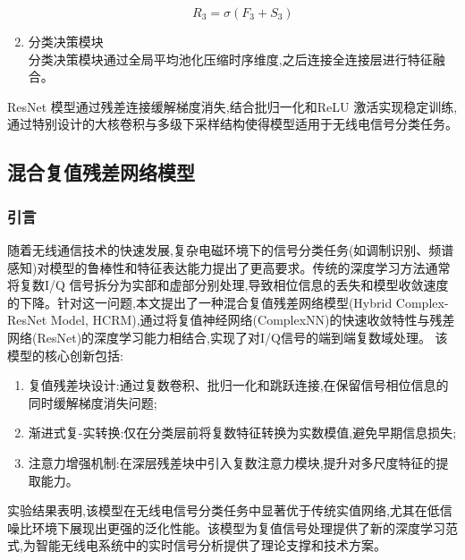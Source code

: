 \documentclass{article}
\begin{document}
\begin{CJK}{UTF8}{gbsn}
\begin{enumerate}
\begin{equation}
        \label{eq:residual_deepen1}
    \end{equation}
    \begin{equation}
        R_{3}=\sigma(F_{3}+S_{3})
        \label{eq:residual_deepen2}
    \end{equation}
    \item 分类决策模块 \\
    分类决策模块通过全局平均池化压缩时序维度,之后连接全连接层进行特征融合。
\end{enumerate}
ResNet 模型通过残差连接缓解梯度消失,结合批归一化和ReLU 激活实现稳定训练,通过特别设计的大核卷积与多级下采样结构使得模型适用于无线电信号分类任务。

\subsection{混合复值残差网络模型}
\subsubsection{引言}
随着无线通信技术的快速发展,复杂电磁环境下的信号分类任务(如调制识别、频谱感知)对模型的鲁棒性和特征表达能力提出了更高要求。传统的深度学习方法通常将复数I/Q 信号拆分为实部和虚部分别处理,导致相位信息的丢失和模型收敛速度的下降。针对这一问题,本文提出了一种混合复值残差网络模型(Hybrid Complex-ResNet Model, HCRM),通过将复值神经网络(ComplexNN)的快速收敛特性与残差网络(ResNet)的深度学习能力相结合,实现了对I/Q信号的端到端复数域处理。
该模型的核心创新包括:
\begin{enumerate}
    \item 复值残差块设计:通过复数卷积、批归一化和跳跃连接,在保留信号相位信息的同时缓解梯度消失问题;
    \item 渐进式复-实转换:仅在分类层前将复数特征转换为实数模值,避免早期信息损失;
    \item 注意力增强机制:在深层残差块中引入复数注意力模块,提升对多尺度特征的提取能力。
\end{enumerate}
实验结果表明,该模型在无线电信号分类任务中显著优于传统实值网络,尤其在低信噪比环境下展现出更强的泛化性能。该模型为复值信号处理提供了新的深度学习范式,为智能无线电系统中的实时信号分析提供了理论支撑和技术方案。


\end{CJK}
\end{document}
